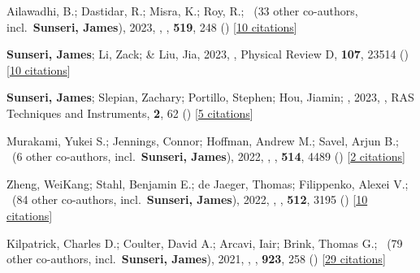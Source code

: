 \item Ailawadhi, B.; Dastidar, R.; Misra, K.; Roy, R.; \etal\ ({33} other co-authors, incl.\ \textbf{Sunseri, James}), 2023, , \mnras, \textbf{519}, 248 () [\href{https://ui.adsabs.harvard.edu/abs/2023MNRAS.519..248A}{10 citations}]

\item \textbf{Sunseri, James}; Li, Zack; \& Liu, Jia, 2023, , Physical Review D, \textbf{107}, 23514 () [\href{https://ui.adsabs.harvard.edu/abs/2023PhRvD.107b3514S}{10 citations}]

\item \textbf{Sunseri, James}; Slepian, Zachary; Portillo, Stephen; Hou, Jiamin; \etal, 2023, , RAS Techniques and Instruments, \textbf{2}, 62 () [\href{https://ui.adsabs.harvard.edu/abs/2023RASTI...2...62S}{5 citations}]

\item Murakami, Yukei S.; Jennings, Connor; Hoffman, Andrew M.; Savel, Arjun B.; \etal\ ({6} other co-authors, incl.\ \textbf{Sunseri, James}), 2022, , \mnras, \textbf{514}, 4489 () [\href{https://ui.adsabs.harvard.edu/abs/2022MNRAS.514.4489M}{2 citations}]

\item Zheng, WeiKang; Stahl, Benjamin E.; de Jaeger, Thomas; Filippenko, Alexei V.; \etal\ ({84} other co-authors, incl.\ \textbf{Sunseri, James}), 2022, , \mnras, \textbf{512}, 3195 () [\href{https://ui.adsabs.harvard.edu/abs/2022MNRAS.512.3195Z}{10 citations}]

\item Kilpatrick, Charles D.; Coulter, David A.; Arcavi, Iair; Brink, Thomas G.; \etal\ ({79} other co-authors, incl.\ \textbf{Sunseri, James}), 2021, , \apj, \textbf{923}, 258 () [\href{https://ui.adsabs.harvard.edu/abs/2021ApJ...923..258K}{29 citations}]